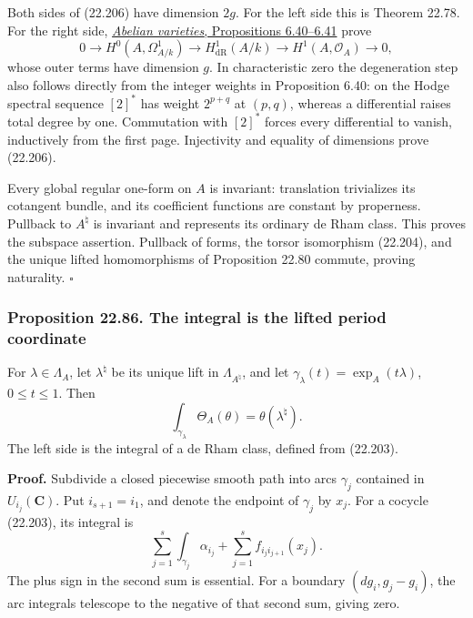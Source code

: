 \documentclass[
  11pt,
  a4paper,
]{article}
\begin{document}
Both sides of (22.206) have dimension \(2g\). For the left side this is
Theorem 22.78. For the right side,
\href{https://github.com/KokunoYumeto/open-math-courses-public/blob/146dc81802e69cf262fb6cc65c1b9f74e71f4625/docs/courses/AG-GS/src/abelian-varieties.md\#the-other-mapped-chapter-vii-consequences}{\emph{Abelian
varieties}, Propositions 6.40--6.41} prove \[
 0\longrightarrow H^0(A,\Omega^1_{A/k})
 \longrightarrow H^1_{\mathrm{dR}}(A/k)
 \longrightarrow H^1(A,\mathcal O_A)\longrightarrow0,
 \tag{22.208}
\] whose outer terms have dimension \(g\). In characteristic zero the
degeneration step also follows directly from the integer weights in
Proposition 6.40: on the Hodge spectral sequence \([2]^*\) has weight
\(2^{p+q}\) at \((p,q)\), whereas a differential raises total degree by
one. Commutation with \([2]^*\) forces every differential to vanish,
inductively from the first page. Injectivity and equality of dimensions
prove (22.206).

Every global regular one-form on \(A\) is invariant: translation
trivializes its cotangent bundle, and its coefficient functions are
constant by properness. Pullback to \(A^\natural\) is invariant and
represents its ordinary de Rham class. This proves the subspace
assertion. Pullback of forms, the torsor isomorphism (22.204), and the
unique lifted homomorphisms of Proposition 22.80 commute, proving
naturality. \(\square\)

\subsubsection{Proposition 22.86. The integral is the lifted period
coordinate}\label{proposition-22.86.-the-integral-is-the-lifted-period-coordinate}

For \(\lambda\in\Lambda_A\), let \(\lambda^\natural\) be its unique lift
in \(\Lambda_{A^\natural}\), and let
\(\gamma_\lambda(t)=\exp_A(t\lambda)\), \(0\le t\le1\). Then \[
 \int_{\gamma_\lambda}\Theta_A(\theta)
       =\theta(\lambda^\natural).
 \tag{22.209}
\] The left side is the integral of a de Rham class, defined from
(22.203).

\textbf{Proof.} Subdivide a closed piecewise smooth path into arcs
\(\gamma_j\) contained in \(U_{i_j}(\mathbf C)\). Put \(i_{s+1}=i_1\),
and denote the endpoint of \(\gamma_j\) by \(x_j\). For a cocycle
(22.203), its integral is \[
 \sum_{j=1}^s\int_{\gamma_j}\alpha_{i_j}
       +\sum_{j=1}^s f_{i_j i_{j+1}}(x_j).
 \tag{22.210}
\] The plus sign in the second sum is essential. For a boundary
\((dg_i,g_j-g_i)\), the arc integrals telescope to the negative of that
second sum, giving zero.
\end{document}
